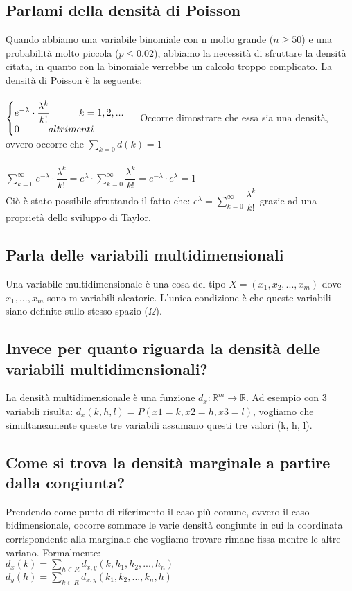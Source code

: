 \documentclass[a4paper,12pt]{report}
\begin{document}
	\subsection{Parlami della densità di Poisson}
	Quando abbiamo una variabile binomiale con n molto grande ($n \ge 50$) e una probabilità molto piccola ($p \leq 0.02$), abbiamo la necessità di sfruttare la densità citata, in quanto con la binomiale verrebbe un calcolo troppo complicato. La densità di Poisson è la seguente:\\ \\
	$
	\begin{cases}
		e^{-\lambda} \cdot \dfrac{\lambda^k}{k!} \qquad\quad k = 1, 2, ... \\  
		0\qquad\quad	altrimenti \\
	\end{cases} \\\\
	$
	Occorre dimostrare che essa sia una densità, ovvero occorre che
	$\sum_{k = 0}d(k) = 1$ \\ \\
	$\sum_{k = 0}^{\infty} e^{-\lambda} \cdot \dfrac{\lambda^k}{k!} = e^\lambda \cdot \sum_{k = 0}^{\infty} \dfrac{\lambda^k}{k!} = e^{-\lambda} \cdot e^{\lambda} = 1$ \\
	Ciò è stato possibile sfruttando il fatto che: $e^{\lambda} = \sum_{k = 0}^{\infty} \dfrac{\lambda^k}{k!}$ grazie ad una proprietà dello sviluppo di Taylor.
	\subsection{Parla delle variabili multidimensionali}
	Una variabile multidimensionale è una cosa del tipo $X = (x_1, x_2, ..., x_m)$ dove $x_1, ..., x_m$ sono m variabili aleatorie. L'unica condizione è che queste  variabili siano definite sullo stesso spazio  ($\Omega$).
	\subsection{Invece per quanto riguarda la densità delle variabili multidimensionali?}
	La densità multidimensionale è una funzione $d_x:\mathbb{R}^m \rightarrow \mathbb{R}$. Ad esempio con 3 variabili risulta: $d_x(k, h, l) = P(x1 = k, x2= h, x3 = l)$, vogliamo che simultaneamente queste tre variabili assumano questi tre valori (k, h, l).
	\subsection{Come si trova la densità marginale a partire dalla congiunta?}
	Prendendo come punto di riferimento il caso più comune, ovvero il caso bidimensionale, occorre sommare le varie densità congiunte in cui la coordinata corrispondente alla marginale che vogliamo trovare rimane fissa mentre le altre variano. Formalmente: \\
	$d_x(k) = \sum_{h \in R}d_{x, y}(k, h_1, h_2, ..., h_n)$ \\
	$d_y(h) = \sum_{k \in R}d_{x, y}(k_1, k_2, ..., k_n, h)$
\end{document}
